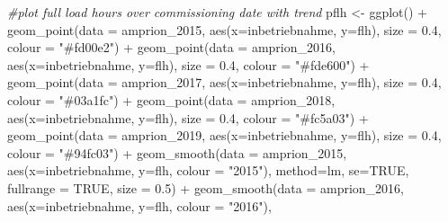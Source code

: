 \documentclass[a4paper,11pt]{article}
\newenvironment{Shaded}{\begin{snugshade}}{\end{snugshade}}
\newcommand{\AttributeTok}[1]{\textcolor[rgb]{0.77,0.63,0.00}{#1}}
\newcommand{\CommentTok}[1]{\textcolor[rgb]{0.56,0.35,0.01}{\textit{#1}}}
\newcommand{\ConstantTok}[1]{\textcolor[rgb]{0.00,0.00,0.00}{#1}}
\newcommand{\FloatTok}[1]{\textcolor[rgb]{0.00,0.00,0.81}{#1}}
\newcommand{\FunctionTok}[1]{\textcolor[rgb]{0.00,0.00,0.00}{#1}}
\newcommand{\NormalTok}[1]{#1}
\newcommand{\OtherTok}[1]{\textcolor[rgb]{0.56,0.35,0.01}{#1}}
\newcommand{\SpecialCharTok}[1]{\textcolor[rgb]{0.00,0.00,0.00}{#1}}
\newcommand{\StringTok}[1]{\textcolor[rgb]{0.31,0.60,0.02}{#1}}
\begin{document}
\begin{Shaded}
\begin{Highlighting}[]
\CommentTok{\#plot full load hours over commissioning date with trend}
\NormalTok{pflh }\OtherTok{\textless{}{-}} \FunctionTok{ggplot}\NormalTok{() }\SpecialCharTok{+}
  \FunctionTok{geom\_point}\NormalTok{(}\AttributeTok{data =}\NormalTok{ amprion\_2015, }\FunctionTok{aes}\NormalTok{(}\AttributeTok{x=}\NormalTok{inbetriebnahme, }\AttributeTok{y=}\NormalTok{flh), }
             \AttributeTok{size =} \FloatTok{0.4}\NormalTok{, }\AttributeTok{colour =} \StringTok{"\#fd00e2"}\NormalTok{) }\SpecialCharTok{+}
  \FunctionTok{geom\_point}\NormalTok{(}\AttributeTok{data =}\NormalTok{ amprion\_2016, }\FunctionTok{aes}\NormalTok{(}\AttributeTok{x=}\NormalTok{inbetriebnahme, }\AttributeTok{y=}\NormalTok{flh), }
             \AttributeTok{size =} \FloatTok{0.4}\NormalTok{, }\AttributeTok{colour =} \StringTok{"\#fde600"}\NormalTok{) }\SpecialCharTok{+}
  \FunctionTok{geom\_point}\NormalTok{(}\AttributeTok{data =}\NormalTok{ amprion\_2017, }\FunctionTok{aes}\NormalTok{(}\AttributeTok{x=}\NormalTok{inbetriebnahme, }\AttributeTok{y=}\NormalTok{flh), }
             \AttributeTok{size =} \FloatTok{0.4}\NormalTok{, }\AttributeTok{colour =} \StringTok{"\#03a1fc"}\NormalTok{) }\SpecialCharTok{+}
  \FunctionTok{geom\_point}\NormalTok{(}\AttributeTok{data =}\NormalTok{ amprion\_2018, }\FunctionTok{aes}\NormalTok{(}\AttributeTok{x=}\NormalTok{inbetriebnahme, }\AttributeTok{y=}\NormalTok{flh), }
             \AttributeTok{size =} \FloatTok{0.4}\NormalTok{, }\AttributeTok{colour =} \StringTok{"\#fc5a03"}\NormalTok{) }\SpecialCharTok{+}
  \FunctionTok{geom\_point}\NormalTok{(}\AttributeTok{data =}\NormalTok{ amprion\_2019, }\FunctionTok{aes}\NormalTok{(}\AttributeTok{x=}\NormalTok{inbetriebnahme, }\AttributeTok{y=}\NormalTok{flh), }
             \AttributeTok{size =} \FloatTok{0.4}\NormalTok{, }\AttributeTok{colour =} \StringTok{"\#94fc03"}\NormalTok{) }\SpecialCharTok{+}
  \FunctionTok{geom\_smooth}\NormalTok{(}\AttributeTok{data =}\NormalTok{ amprion\_2015, }
              \FunctionTok{aes}\NormalTok{(}\AttributeTok{x=}\NormalTok{inbetriebnahme, }\AttributeTok{y=}\NormalTok{flh, }\AttributeTok{colour =} \StringTok{"2015"}\NormalTok{), }
              \AttributeTok{method=}\NormalTok{lm, }\AttributeTok{se=}\ConstantTok{TRUE}\NormalTok{, }\AttributeTok{fullrange =} \ConstantTok{TRUE}\NormalTok{, }\AttributeTok{size =} \FloatTok{0.5}\NormalTok{)  }\SpecialCharTok{+}
  \FunctionTok{geom\_smooth}\NormalTok{(}\AttributeTok{data =}\NormalTok{ amprion\_2016, }
              \FunctionTok{aes}\NormalTok{(}\AttributeTok{x=}\NormalTok{inbetriebnahme, }\AttributeTok{y=}\NormalTok{flh, }\AttributeTok{colour =} \StringTok{"2016"}\NormalTok{), }

\end{Highlighting}
\end{Shaded}
\end{document}
